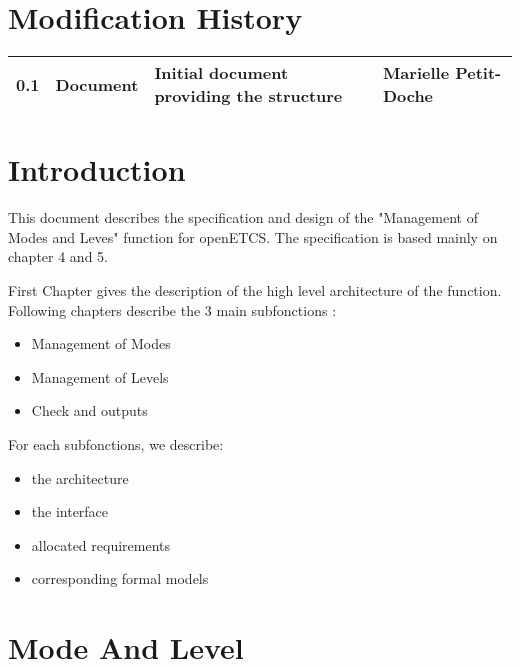 \documentclass{template/openetcs_report}
\begin{document}


\chapter*{Modification History}
\begin{supertabular}{| m{1.2cm} | m{1.5cm} | m{6.6cm} | m{3.7cm} |}
0.1 & Document & Initial document providing the structure & Marielle Petit-Doche \\\hline

\end{supertabular}

\setcounter{tocdepth}{3}


\tableofcontents
\listoffiguresandtables
\newpage




\mainmatter

\chapter{Introduction}


This document describes the specification and design of the "Management of Modes and Leves" function for openETCS. The specification is based mainly on \citep{subset-026} chapter 4 and 5.

First Chapter gives the description of the high level architecture of the function.
Following chapters describe the 3 main subfonctions :
\begin{itemize}
\item Management of Modes
\item Management of Levels
\item Check and outputs
\end{itemize}

For each subfonctions, we describe:
\begin{itemize}
\item the architecture
\item the interface
\item allocated requirements
\item corresponding formal models
\end{itemize}

\chapter{Mode And Level}








\newpage
{}
\printindex
\end{document}
